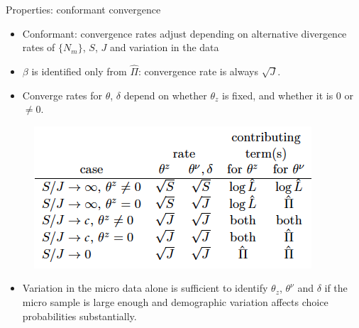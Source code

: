 \begin{frame}{Properties: conformant convergence}
    
    \begin{itemize}
        \item Conformant: convergence rates adjust depending on alternative divergence rates of $\{N_m\}$, $S$, $J$ and variation in the data
        \item $\beta$ is identified only from $\hat{\Pi}$: convergence rate is always $\sqrt{J}$.
        \item Converge rates for $\theta$, $\delta$ depend on whether $\theta_z$ is fixed, and whether it is 0 or $\neq 0$.
    \end{itemize}
    
    \begin{figure}[htbp]
    \begin{center}
    \includegraphics[width=.4\linewidth]{resources/conformant}
    \label{default}
    \end{center}
    \end{figure}

    \begin{itemize}
        \item Variation in the micro data alone is sufficient to identify $\theta_z$, $\theta^\nu$ and $\delta$ if the micro sample is large enough and demographic variation affects choice probabilities substantially.
    \end{itemize}
\end{frame}






